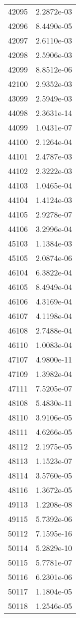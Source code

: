 \begin{table}[h!]
\begin{tabular}{|| c || c |}
42095 & 2.2872e-03 \\
42096 & 8.4490e-05 \\
42097 & 2.6110e-03 \\
42098 & 2.5906e-03 \\
42099 & 8.8512e-06 \\
42100 & 2.9352e-03 \\
43099 & 2.5949e-03 \\
44098 & 2.3631e-14 \\
44099 & 1.0431e-07 \\
44100 & 2.1264e-04 \\
44101 & 2.4787e-03 \\
44102 & 2.3222e-03 \\
44103 & 1.0465e-04 \\
44104 & 1.4124e-03 \\
44105 & 2.9278e-07 \\
44106 & 3.2996e-04 \\
45103 & 1.1384e-03 \\
45105 & 2.0874e-06 \\
46104 & 6.3822e-04 \\
46105 & 8.4949e-04 \\
46106 & 4.3169e-04 \\
46107 & 4.1198e-04 \\
46108 & 2.7488e-04 \\
46110 & 1.0083e-04 \\
47107 & 4.9800e-11 \\
47109 & 1.3982e-04 \\
47111 & 7.5205e-07 \\
48108 & 5.4830e-11 \\
48110 & 3.9106e-05 \\
48111 & 4.6266e-05 \\
48112 & 2.1975e-05 \\
48113 & 1.1523e-07 \\
48114 & 3.5760e-05 \\
48116 & 1.3672e-05 \\
49113 & 1.2208e-08 \\
49115 & 5.7392e-06 \\
50112 & 7.1595e-16 \\
50114 & 5.2829e-10 \\
50115 & 5.7781e-07 \\
50116 & 6.2301e-06 \\
50117 & 1.1804e-05 \\
50118 & 1.2546e-05 \\

\end{tabular}
\end{table}
